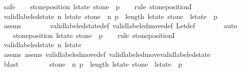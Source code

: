 \begin{isabellebody}
%
\isadelimproof
%
\endisadelimproof
%
\isatagproof
{}\isamarkupfalse%
\ safe\isanewline
\ \ \isamarkupfalse%
\ {\isachardoublequoteopen}stone{\isacharunderscore}position\ l{\isacharunderscore}state\ stone\ {\isacharequal}\ p{}{\isachardoublequoteclose}\isanewline
\ \ \isamarkupfalse%
\ {\isacharparenleft}rule\ stone{\isacharunderscore}positionI{\isacharparenright}\isanewline
\ \ \ \ \isamarkupfalse%
\ {\isachardoublequoteopen}valid{\isacharunderscore}labeled{\isacharunderscore}state\ n\ l{\isacharunderscore}state{\isachardoublequoteclose}\ {\isachardoublequoteopen}stone\ {\isacharless}\ n{\isachardoublequoteclose}\ {\isachardoublequoteopen}p{}\ {\isacharless}\ length\ l{\isacharunderscore}state{\isachardoublequoteclose}\ {\isachardoublequoteopen}stone\ {\isasymin}\ l{\isacharunderscore}state\ {\isacharbang}\ p{}{\isachardoublequoteclose}\isanewline
\ \ \ \ \ \ \isamarkupfalse%
\ assms\isanewline
\ \ \ \ \ \ \isamarkupfalse%
\ valid{\isacharunderscore}labeled{\isacharunderscore}state{\isacharunderscore}def\ valid{\isacharunderscore}labeled{\isacharunderscore}move{\isacharprime}{\isacharunderscore}def\ Let{\isacharunderscore}def\isanewline
\ \ \ \ \ \ \isamarkupfalse%
\ auto\isanewline
\ \ \isamarkupfalse%
\isanewline
{}\isamarkupfalse%
\isanewline
\ \ \isamarkupfalse%
\ {\isachardoublequoteopen}stone{\isacharunderscore}position\ l{\isacharunderscore}state{\isacharprime}\ stone\ {\isacharequal}\ p{}{\isachardoublequoteclose}\isanewline
\ \ \isamarkupfalse%
\ {\isacharparenleft}rule\ stone{\isacharunderscore}positionI{\isacharparenright}\isanewline
\ \ \ \ \isamarkupfalse%
\ {\isachardoublequoteopen}valid{\isacharunderscore}labeled{\isacharunderscore}state\ n\ l{\isacharunderscore}state{\isacharprime}{\isachardoublequoteclose}\isanewline
\ \ \ \ \ \ \isamarkupfalse%
\ assms{\isacharparenleft}{}{\isacharparenright}\ assms{\isacharparenleft}{}{\isacharparenright}\ valid{\isacharunderscore}labeled{\isacharunderscore}move{\isacharunderscore}def\ valid{\isacharunderscore}labeled{\isacharunderscore}move{\isacharunderscore}valid{\isacharunderscore}labeled{\isacharunderscore}state\isanewline
\ \ \ \ \ \ \isamarkupfalse%
\ blast\isanewline
\ \ \isamarkupfalse%
\isanewline
\ \ \ \ \isamarkupfalse%
\ {\isachardoublequoteopen}stone\ {\isacharless}\ n{\isachardoublequoteclose}\ {\isachardoublequoteopen}p{}\ {\isacharless}\ length\ l{\isacharunderscore}state{\isacharprime}{\isachardoublequoteclose}\ {\isachardoublequoteopen}stone\ {\isasymin}\ l{\isacharunderscore}state{\isacharprime}\ {\isacharbang}\ p{}{\isachardoublequoteclose}\isanewline

\end{isabellebody}
